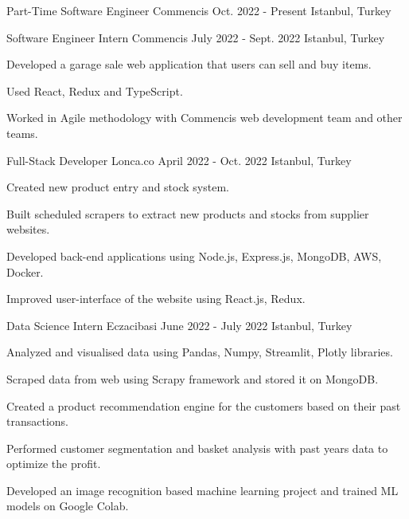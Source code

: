 
\begin{cventries}

  \cventry
    {Part-Time Software Engineer}
    {Commencis}
    {Oct. 2022 - Present}
    {Istanbul, Turkey}
    {
      \begin{cvitems}
      \end{cvitems}
    }

  \cventry
    {Software Engineer Intern}
    {Commencis}
    {July 2022 - Sept. 2022}
    {Istanbul, Turkey}
    {
      \begin{cvitems}
        \item {Developed a garage sale web application that users can sell and buy items.}
        \item {Used React, Redux and TypeScript.}
        \item {Worked in Agile methodology with Commencis web development team and other teams.}
      \end{cvitems}
    }

  \cventry
    {Full-Stack Developer}
    {Lonca.co}
    {April 2022 - Oct. 2022}
    {Istanbul, Turkey}
    {
      \begin{cvitems}
        \item {Created new product entry and stock system.}
        \item {Built scheduled scrapers to extract new products and stocks from supplier websites.}
        \item {Developed back-end applications using Node.js, Express.js, MongoDB, AWS, Docker.}
        \item {Improved user-interface of the website using React.js, Redux.}
      \end{cvitems}
    }

  \cventry
    {Data Science Intern}
    {Eczacibasi}
    {June 2022 - July 2022}
    {Istanbul, Turkey}
    {
      \begin{cvitems}
        \item {Analyzed and visualised data using Pandas, Numpy, Streamlit, Plotly libraries.}
        \item {Scraped data from web using Scrapy framework and stored it on MongoDB.}
        \item {Created a product recommendation engine for the customers based on their past transactions.}
        \item {Performed customer segmentation and basket analysis with past years data to optimize the profit.}
        \item {Developed an image recognition based machine learning project and trained ML models on Google Colab.}
      \end{cvitems}
    }


\end{cventries}
